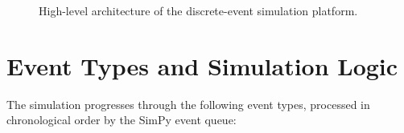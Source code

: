 \documentclass[12pt,a4paper]{report}
\begin{document}
\begin{figure}[ht]
 \centering
\caption{High-level architecture of the discrete-event simulation platform.}
\label{fig:sim_arch}
\end{figure}

\section{Event Types and Simulation Logic}

The simulation progresses through the following event types, processed in chronological order by the SimPy event queue:
\end{document}

